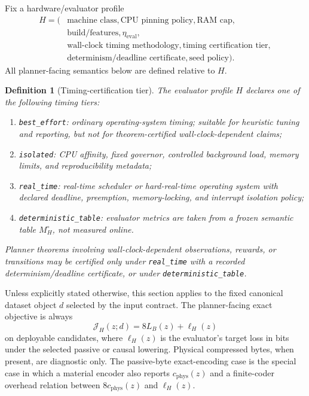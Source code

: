 \documentclass[11pt]{article}
\newtheorem{definition}{Definition}
\begin{document}
Fix a hardware/evaluator profile
\[
\begin{aligned}
H=\bigl(&\text{machine class},\text{CPU pinning policy},\text{RAM cap},\\
&\text{build/features},\eta_{\mathrm{eval}},\\
&\text{wall-clock timing methodology},\text{timing certification tier},\\
&\text{determinism/deadline certificate},\text{seed policy}\bigr).
\end{aligned}
\]
All planner-facing semantics below are defined relative to $H$.

\begin{definition}[Timing-certification tier]
The evaluator profile $H$ declares one of the following timing tiers:
\begin{enumerate}
    \item \texttt{best\_effort}: ordinary operating-system timing; suitable for
    heuristic tuning and reporting, but not for theorem-certified
    wall-clock-dependent claims;
    \item \texttt{isolated}: CPU affinity, fixed governor, controlled
    background load, memory limits, and reproducibility metadata;
    \item \texttt{real\_time}: real-time scheduler or hard-real-time operating
    system with declared deadline, preemption, memory-locking, and interrupt
    isolation policy;
    \item \texttt{deterministic\_table}: evaluator metrics are taken from a
    frozen semantic table $M_H^\circ$, not measured online.
\end{enumerate}
Planner theorems involving wall-clock-dependent observations, rewards, or
transitions may be certified only under \texttt{real\_time} with a recorded
determinism/deadline certificate, or under
\texttt{deterministic\_table}.
\end{definition}

Unless explicitly stated otherwise, this section applies to the fixed canonical
dataset object $d$ selected by the input contract. The planner-facing exact
objective is always
\[
\mathcal{J}_H(z;d)=8L_B(z)+\ell_H(z)
\]
on deployable candidates, where $\ell_H(z)$ is the evaluator's target loss in
bits under the selected passive or causal lowering. Physical compressed bytes,
when present, are diagnostic only. The passive-byte exact-encoding case is the
special case in which a material encoder also reports
$c_{\mathrm{phys}}(z)$ and a finite-coder overhead relation between
$8c_{\mathrm{phys}}(z)$ and $\ell_H(z)$.
\end{document}

